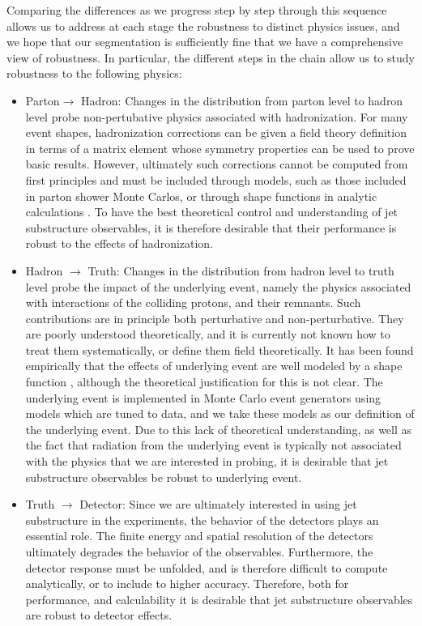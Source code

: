 \documentclass[11pt,letterpaper]{article}
\begin{document}
Comparing the differences as we progress step by step through this sequence allows us to address at each stage the robustness to distinct physics issues, and we hope that our segmentation is sufficiently fine that we have a comprehensive view of robustness. In particular, the different steps in the chain allow us to study robustness to the following physics: 
\begin{itemize}
\item Parton$\to$ Hadron: Changes in the distribution from parton level to hadron level probe non-pertubative physics associated with hadronization. For many event shapes, hadronization corrections can be given a field theory definition in terms of a matrix element whose symmetry properties can be used to prove basic results. However, ultimately such corrections cannot be computed from first principles and must be included through models, such as those included in parton shower Monte Carlos, or through shape functions in analytic calculations \cite{Korchemsky:1999kt,Korchemsky:2000kp,Bosch:2004th,Hoang:2007vb,Ligeti:2008ac}.  To have the best theoretical control and understanding of jet substructure observables, it is therefore desirable that their performance is robust to the effects of hadronization.
\item Hadron $\to$ Truth: Changes in the distribution from hadron level to truth level probe the impact of the underlying event, namely the physics associated with interactions of the colliding protons, and their remnants. Such contributions are in principle both perturbative and non-perturbative. They are poorly understood theoretically, and it is currently not known how to treat them systematically, or define them field theoretically. It has been found empirically that the effects of underlying event are well modeled by a shape function \cite{Stewart:2014nna}, although the theoretical justification for this is not clear.  The underlying event is implemented in Monte Carlo event generators using models which are tuned to data, and we take these models as our definition of the underlying event. Due to this lack of theoretical understanding, as well as the fact that radiation from the underlying event is typically not associated with the physics that we are interested in probing, it is desirable that jet substructure observables be robust to underlying event.
\item Truth $\to$ Detector: Since we are ultimately interested in using jet substructure in the experiments, the behavior of the detectors plays an essential role. The finite energy and spatial resolution of the detectors ultimately degrades the behavior of the observables. Furthermore, the detector response must be unfolded, and is therefore difficult to compute analytically, or to include to higher accuracy. Therefore, both for performance, and calculability it is desirable that jet substructure observables are robust to detector effects.

\end{itemize}
\end{document}
